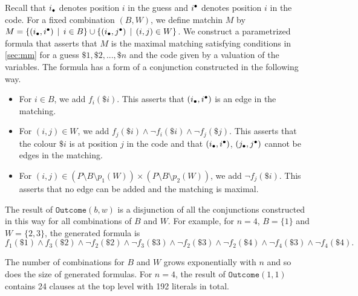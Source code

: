 \begin{example}[Mastermind]
Recall that $i_\bullet$ denotes position $i$ in the guess
  and $i^\bullet$ denotes position $i$ in the code.
For a fixed combination $(B, W)$, we define matchin $M$ by
 $M = \{(i_\bullet, i^\bullet) \:\:|\:\: i\in B \} \cup
      \{(i_\bullet, j^\bullet) \:\:|\:\: (i, j)\in W \}$.
We construct a parametrized formula
  that asserts that $M$ is the maximal matching satisfying conditions in \autoref{sec:mm}
  for a guess $\$1,\$2,...,\$n$ and the code given by a valuation of the variables.
The formula has a form of a conjunction constructed in the following way.
\begin{itemize}
\item For $i\in B$, we add $f_i(\$i)$.
  This asserts that $(i_\bullet, i^\bullet)$ is an edge in the matching.
\item For $(i,j)\in W$, we add $f_j(\$i) \wedge \neg f_i(\$i) \wedge \neg f_j(\$j)$.
  This asserts that the colour $\$i$ is at position $j$ in the code and that
  $(i_\bullet, i^\bullet)$, $(j_\bullet, j^\bullet)$ cannot be edges
  in the matching.
\item For $(i,j)\in (P\setminus B\setminus p_1(W))
             \times (P\setminus B\setminus p_2(W))$, we add $\neg f_j(\$i)$.
  This asserts that no edge can be added and the matching is maximal.
\end{itemize}

The result of $\texttt{Outcome}(b, w)$ is a disjunction
  of all the conjunctions constructed in this way
  for all combinations of $B$ and $W$.
For example, for $n = 4$, $B = \{1\}$ and $W = \{2, 3\}$, the generated formula is
\[ f_1(\$1) \wedge f_3(\$2) \wedge \neg f_2(\$2) \wedge \neg f_3(\$3)
  \wedge \neg f_2(\$3) \wedge \neg f_2(\$4) \wedge \neg f_4(\$3) \wedge \neg f_4(\$4). \]

The number of combinations for $B$ and $W$ grows exponentially
  with $n$ and so does the size of generated formulas.
For $n = 4$, the result of $\texttt{Outcome}(1, 1)$
contains 24 clauses at the top level with 192 literals in total.\eqed




\end{example}
